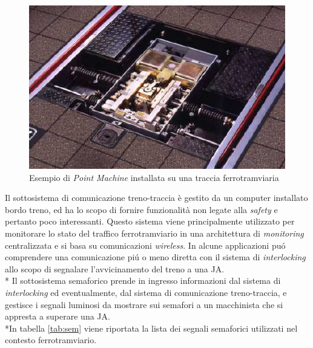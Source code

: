 \begin{itemize}
\begin{figure}[h]
		\centering
		\includegraphics[width=0.7\linewidth]{img/pointmachine}
		\caption{Esempio di \emph{Point Machine} installata su una traccia ferrotramviaria}
		\label{fig:pointmachine}
	\end{figure}
\end{itemize}
Il sottosistema di comunicazione treno-traccia \`e gestito da un computer installato bordo treno, ed ha lo scopo di fornire funzionalit\`a non legate alla \emph{safety} e pertanto poco interessanti. Questo sistema viene principalmente utilizzato per monitorare lo stato del traffico ferrotramviario in una architettura di \emph{monitoring} centralizzata e si basa su comunicazioni \emph{wireless}. In alcune applicazioni pu\'o comprendere una comunicazione pi\'u o meno diretta con il sistema di \emph{interlocking} allo scopo di segnalare l'avvicinamento del treno a una JA.\\*
Il sottosistema semaforico prende in ingresso informazioni dal sistema di \emph{interlocking} ed eventualmente, dal sistema di comunicazione treno-traccia, e gestisce i segnali luminosi da mostrare sui semafori a un macchinista che si appresta a superare una JA.\\*In tabella \ref{tab:sem} viene riportata la lista dei segnali semaforici utilizzati nel contesto ferrotramviario.
